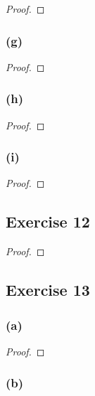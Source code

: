 \documentclass[14pt]{extarticle}
\begin{document}
\begin{proof}

\end{proof}

\subsubsection{(g)}

\begin{proof}

\end{proof}

\subsubsection{(h)}

\begin{proof}

\end{proof}

\subsubsection{(i)}

\begin{proof}

\end{proof}

\subsection{Exercise 12}

\begin{proof}

\end{proof}

\subsection{Exercise 13}

\subsubsection{(a)}

\begin{proof}

\end{proof}

\subsubsection{(b)}
\end{document}
